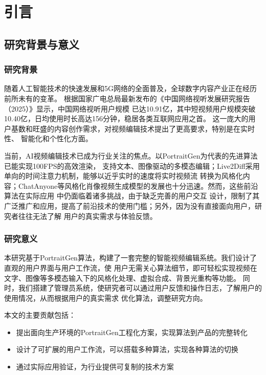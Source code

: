 
\chapter{引言}

\section{研究背景与意义}

\subsection{研究背景}

随着人工智能技术的快速发展和5G网络的全面普及，全球数字内容产业正在经历前所未有的变革。
根据国家广电总局最新发布的《中国网络视听发展研究报告（2025）》显示，中国网络视听用户规模
已达10.91亿，其中短视频用户规模突破10.40亿，日均使用时长高达156分钟，稳居各类互联网应用之首。
这一庞大的用户基数和旺盛的内容创作需求，对视频编辑技术提出了更高要求，特别是在实时性、
智能化和个性化方面。

当前，AI视频编辑技术已成为行业关注的焦点。以PortraitGen为代表的先进算法已能实现100FPS的高效渲染，
支持文本、图像驱动的多模态编辑；Live2Diff采用单向的时间注意力机制，能够以近乎实时的速度将实时视频流
转换为风格化内容；ChatAnyone等风格化肖像视频生成模型的发展也十分迅速。然而，这些前沿算法在实际应用
中仍面临着诸多挑战，由于缺乏完善的用户交互
设计，限制了其广泛推广和应用，提高了前沿技术的使用门槛；另外，因为没有直接面向用户，研究者往往无法了解
用户的真实需求与体验反馈。

\subsection{研究意义}

本研究基于PortraitGen算法，构建了一套完整的智能视频编辑系统。我们设计了直观的用户界面与用户工作流，使
用户无需关心算法细节，即可轻松实现视频在文字、图像等多模态输入下的风格化处理、虚拟合成、背景光重构等功能。
同时，我们搭建了管理员系统，使研究者可以通过用户反馈和操作日志，了解用户的使用情况，从而根据用户的真实需求
优化算法，调整研究方向。

本文的主要贡献包括：
\begin{itemize}
    \item 提出面向生产环境的PortraitGen工程化方案，实现算法到产品的完整转化
    \item 设计了可扩展的用户工作流，可以搭载多种算法，实现各种算法的切换
    \item 通过实际应用验证，为行业提供可复制的技术方案
\end{itemize}

